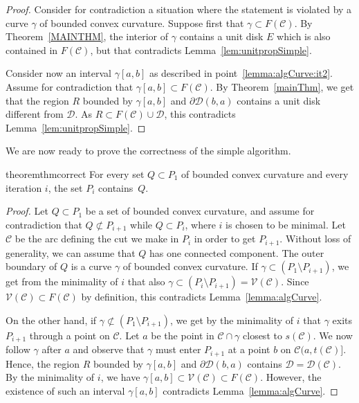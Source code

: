 \documentclass{article}
\newcommand{\PP}{P}
\newcommand{\QQ}{Q}
\newcommand{\VV}{\mathcal V}
\newcommand{\cutreg}{F}
\newcommand{\cut}{\mathcal C}
\newcommand{\cutdisk}{\mathcal D}
\newcommand{\start}{s}
\newcommand{\terminal}{t}
\begin{document}
\begin{proof}
Consider for contradiction
a situation where the statement is violated by a curve $\gamma$ of bounded convex curvature.
Suppose first that $\gamma\subset \cutreg(\cut)$.
By Theorem~\ref{MAINTHM}, the interior of $\gamma$ contains a unit disk $E$ which is also contained in $\cutreg(\cut)$, but that contradicts Lemma~\ref{lem:unitpropSimple}.

Consider now an interval $\gamma[a,b]$ as described in point~\ref{lemma:algCurve:it2}.
Assume for contradiction that $\gamma[a,b]\subset \cutreg(\cut)$.
By Theorem~\ref{mainThm}, we get that the region $R$ bounded by $\gamma[a,b]$ and $\partial\cutdisk(b,a)$ contains a unit disk different from $\cutdisk$.
As $R\subset\cutreg(\cut)\cup\cutdisk$, this contradicts Lemma~\ref{lem:unitpropSimple}.
\end{proof}

We are now ready to prove the correctness of the simple algorithm.

\begin{restatable}{theorem}{thmcorrect}
\label{algOptimalSimple}
For every set $\QQ\subset \PP_1$ of bounded convex curvature and every iteration $i$, the set $\PP_i$ contains~$\QQ$.
\end{restatable}

\begin{proof}
Let $\QQ\subset \PP_1$ be a set of bounded convex curvature, and assume for contradiction that $\QQ\not\subset\PP_{i+1}$ while $\QQ\subset\PP_i$, where $i$ is chosen to be minimal.
Let $\cut$ be the arc defining the cut we make in $\PP_i$ in order to get $\PP_{i+1}$.
Without loss of generality, we can assume that $\QQ$ has one connected component.
The outer boundary of $\QQ$ is a curve $\gamma$ of bounded convex curvature.
If $\gamma\subset(\PP_1\setminus\PP_{i+1})$, we get from the minimality of $i$ that also $\gamma\subset(\PP_i\setminus\PP_{i+1})=\VV(\cut)$.
Since $\VV(\cut)\subset \cutreg(\cut)$ by definition, this contradicts Lemma~\ref{lemma:algCurve}.

On the other hand, if $\gamma\not\subset(\PP_1\setminus\PP_{i+1})$, we get by the minimality of $i$ that $\gamma$ exits $\PP_{i+1}$ through a point on $\cut$.
Let $a$ be the point in $\cut\cap \gamma$ closest to $\start(\cut)$.
We now follow $\gamma$ after $a$ and observe that $\gamma$ must enter $\PP_{i+1}$ at a point $b$ on $\cut(a,\terminal(\cut)]$.
Hence, the region $R$ bounded by $\gamma[a,b]$ and $\partial\cutdisk(b,a)$ contains $\cutdisk=\cutdisk(\cut)$.
By the minimality of $i$, we have $\gamma[a,b]\subset \VV(\cut)\subset\cutreg(\cut)$.
However, the existence of such an interval $\gamma[a,b]$ contradicts Lemma~\ref{lemma:algCurve}.
\end{proof}
\end{document}

